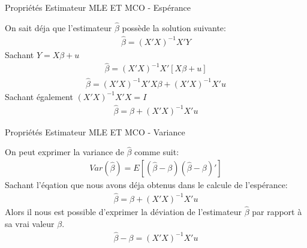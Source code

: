 \documentclass{beamer}
\begin{document}
\begin{frame}{Propriétés Estimateur MLE ET MCO - Espérance}

On sait déja que l'estimateur $\hat{\beta}$ possède la solution suivante:
\begin{align*}
\hat{\beta} = (X'X)^{-1}X'Y
\end{align*}
Sachant $Y= X\beta +u$
\begin{align*}
\hat{\beta} = (X'X)^{-1}X'[X\beta +u]
\end{align*}
\begin{align*}
\hat{\beta} = (X'X)^{-1}X'X\beta +(X'X)^{-1}X'u
\end{align*}
Sachant également $(X'X)^{-1}X'X = I$
\begin{align*}
\hat{\beta} = \beta +(X'X)^{-1}X'u
\end{align*}

\end{frame}




\begin{frame}{Propriétés Estimateur MLE ET MCO - Variance}

On peut exprimer la variance de $\hat{\beta}$ comme suit:
\begin{align*}
Var(\hat{\beta})=E[(\hat{\beta}-\beta)(\hat{\beta}-\beta)']
\end{align*}
Sachant l'éqation que nous avons déja obtenus dans le calcule de l'espérance:
\begin{align*}
\hat{\beta}=\beta +(X'X)^{-1}X'u
\end{align*}
Alors il nous est possible d'exprimer la déviation de l'estimateur $\hat{\beta}$ par rapport à sa vrai valeur $\beta$.
\begin{align*}
\hat{\beta}-\beta = (X'X)^{-1}X'u
\end{align*}

\end{frame}
\end{document}
